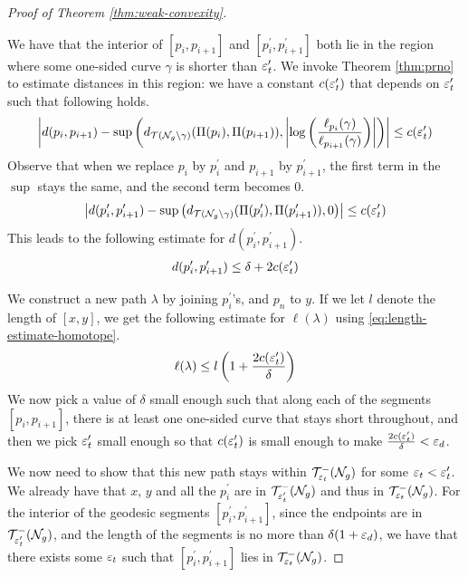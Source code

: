 \documentclass[12pt, reqno]{amsart}
\begin{document}
\begin{proof}[Proof of Theorem \ref{thm:weak-convexity}]
\begin{enumerate}[(i)]
    We have that the interior of $[p_i, p_{i+1}]$ and $[p_i^{\prime}, p_{i+1}^{\prime}]$ both lie in the region where some one-sided curve $\gamma$ is shorter than $\varepsilon_t^{\prime}$.
    We invoke Theorem \ref{thm:prno} to estimate distances in this region: we have a constant $c(\varepsilon_t^{\prime})$ that depends on $\varepsilon_t^{\prime}$ such that following holds.
    \begin{align}
      \label{eq:p-estimate}
      \left| d(p_i, p_{i+1}) - \sup\left( d_{\mathcal{T}(\mathcal{N}_g \setminus \gamma)}(\Pi(p_i), \Pi(p_{i+1})), \left| \log \left( \frac{\ell_{p_i}(\gamma)}{\ell_{p_{i+1}}(\gamma)}  \right) \right| \right) \right| \leq c(\varepsilon_t^{\prime})
    \end{align}
    Observe that when we replace $p_i$ by $p_i^{\prime}$ and $p_{i+1}$ by $p_{i+1}^{\prime}$, the first term in the $\sup$ stays the same, and the second term becomes $0$.
    \begin{align}
      \label{eq:p-prime-estimate}
      \left| d(p_i^{\prime}, p_{i+1}^{\prime}) - \sup\left( d_{\mathcal{T}(\mathcal{N}_g \setminus \gamma)}(\Pi(p_i^{\prime}), \Pi(p_{i+1}^{\prime})), 0 \right) \right| \leq c(\varepsilon_t^{\prime})
    \end{align}
    This leads to the following estimate for $d(p_i^{\prime}, p_{i+1}^{\prime})$.
    \begin{align}
      \label{eq:length-estimate-homotope}
      d(p_i^{\prime}, p_{i+1}^{\prime}) \leq \delta + 2c(\varepsilon_t^{\prime})
    \end{align}
  \end{enumerate}
  We construct a new path $\lambda$ by joining $p_i^{\prime}$'s, and $p_n$ to $y$.
  If we let $l$ denote the length of $[x,y]$, we get the following estimate for $\ell(\lambda)$ using \eqref{eq:length-estimate-homotope}.
  \begin{align*}
    \ell(\lambda) \leq l \left( 1 + \frac{2c(\varepsilon_t^{\prime})}{\delta} \right)
  \end{align*}
  We now pick a value of $\delta$ small enough such that along each of the segments $[p_i, p_{i+1}]$, there is at least one one-sided curve that stays short throughout, and then we pick $\varepsilon_t^{\prime}$ small enough so that $c(\varepsilon_t^{\prime})$ is small enough to make $\frac{2c(\varepsilon_t^{\prime})}{\delta} < \varepsilon_d$.

  We now need to show that this new path stays within $\mathcal{T}_{\varepsilon_t}^{-}(\mathcal{N}_g)$ for some $\varepsilon_t < \varepsilon_t^{\prime}$.
  We already have that $x$, $y$ and all the $p_{i}^{\prime}$ are in $\mathcal{T}_{\varepsilon_t^{\prime}}^{-}(\mathcal{N}_g)$ and thus in $\mathcal{T}_{\varepsilon_t}^{-}(\mathcal{N}_g)$.
  For the interior of the geodesic segments $[p_i^{\prime}, p_{i+1}^{\prime}]$, since the endpoints are in $\mathcal{T}_{\varepsilon_t^{\prime}}^{-}(\mathcal{N}_g)$, and the length of the segments is no more than $\delta(1 + \varepsilon_d)$, we have that there exists some $\varepsilon_t$ such that $[p_i^{\prime}, p_{i+1}^{\prime}]$ lies in $\mathcal{T}_{\varepsilon_t}^{-}(\mathcal{N}_g)$.


\end{proof}
\end{document}
